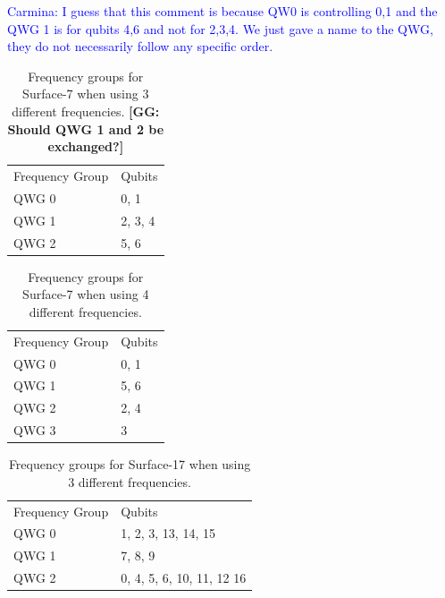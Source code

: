 \documentclass[11pt]{article}
\def\noteGG#1{\textbf{\color{red}[GG: #1]}}
\begin{document}
\begin{table}[h!]


\caption{\label{T1}
Frequency groups for Surface-7 when using 3 different frequencies.
\noteGG{Should QWG 1 and 2 be exchanged?}}\textcolor{blue}{Carmina: I guess that this comment is because QW0 is controlling 0,1 and the QWG 1 is for qubits 4,6 and not for 2,3,4. We just gave a name to the QWG, they do not necessarily follow any specific order. }
\centering

\begin{tabular}{ll}
 & \\
\hline
Frequency Group & Qubits\\
\hline
\cellcolor{red!25} QWG 0 & \cellcolor{red!25} 0, 1\\
\cellcolor{Aquamarine!25} QWG 1 & \cellcolor{Aquamarine!25} 2, 3, 4\\
\cellcolor{pink!25} QWG 2 & \cellcolor{pink!25} 5, 6\\

\hline
\end{tabular}
\end{table}

 
 \begin{table}[h!]


\caption{\label{T2}
Frequency groups for Surface-7 when using 4 different frequencies.}
\centering
\begin{tabular}{ll}
 & \\
\hline
Frequency Group & Qubits\\
\hline
\cellcolor{red!25} QWG 0 & \cellcolor{red!25} 0, 1\\
\cellcolor{pink!25} QWG 1 & \cellcolor{pink!25} 5, 6\\
\cellcolor{green!25} QWG 2 & \cellcolor{green!25} 2, 4\\
\cellcolor{cyan!25} QWG 3 & \cellcolor{cyan!25} 3\\
\hline
\end{tabular}
\end{table}
 
 
 





\begin{table}[h!]

\caption{\label{T4}
Frequency groups for Surface-17 when using 3 different frequencies.}
\centering
\begin{tabular}{ll}
 & \\
\hline
Frequency Group & Qubits\\
\hline
\cellcolor{red!25} QWG 0 & \cellcolor{red!25} 1, 2, 3, 13, 14, 15\\
\cellcolor{pink!25} QWG 1 & \cellcolor{pink!25} 7, 8, 9\\
\cellcolor{Aquamarine!25} QWG 2 & \cellcolor{Aquamarine!25} 0, 4, 5, 6, 10, 11, 12 16\\
\hline
\end{tabular}
\end{table}
\end{document}
